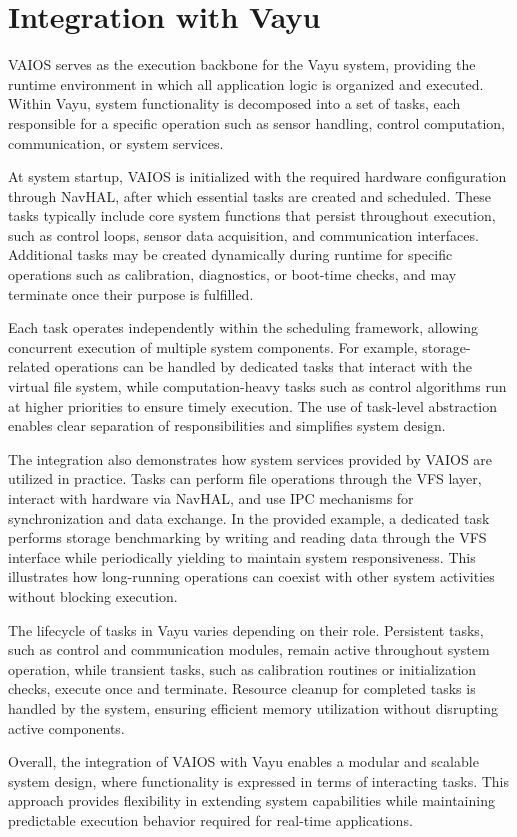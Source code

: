 \section{Integration with Vayu}
\label{sec:vaios_vayu_integration}

VAIOS serves as the execution backbone for the Vayu system, providing the runtime environment in which all application logic is organized and executed. Within Vayu, system functionality is decomposed into a set of tasks, each responsible for a specific operation such as sensor handling, control computation, communication, or system services.

At system startup, VAIOS is initialized with the required hardware configuration through NavHAL, after which essential tasks are created and scheduled. These tasks typically include core system functions that persist throughout execution, such as control loops, sensor data acquisition, and communication interfaces. Additional tasks may be created dynamically during runtime for specific operations such as calibration, diagnostics, or boot-time checks, and may terminate once their purpose is fulfilled.

Each task operates independently within the scheduling framework, allowing concurrent execution of multiple system components. For example, storage-related operations can be handled by dedicated tasks that interact with the virtual file system, while computation-heavy tasks such as control algorithms run at higher priorities to ensure timely execution. The use of task-level abstraction enables clear separation of responsibilities and simplifies system design.

The integration also demonstrates how system services provided by VAIOS are utilized in practice. Tasks can perform file operations through the VFS layer, interact with hardware via NavHAL, and use IPC mechanisms for synchronization and data exchange. In the provided example, a dedicated task performs storage benchmarking by writing and reading data through the VFS interface while periodically yielding to maintain system responsiveness. This illustrates how long-running operations can coexist with other system activities without blocking execution.

The lifecycle of tasks in Vayu varies depending on their role. Persistent tasks, such as control and communication modules, remain active throughout system operation, while transient tasks, such as calibration routines or initialization checks, execute once and terminate. Resource cleanup for completed tasks is handled by the system, ensuring efficient memory utilization without disrupting active components.

Overall, the integration of VAIOS with Vayu enables a modular and scalable system design, where functionality is expressed in terms of interacting tasks. This approach provides flexibility in extending system capabilities while maintaining predictable execution behavior required for real-time applications.